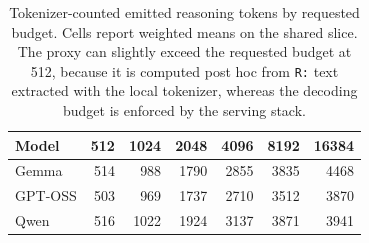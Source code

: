 \begin{table}[t]
    \centering
    \caption{Tokenizer-counted emitted reasoning tokens by requested budget. Cells report weighted means on the shared slice. The proxy can slightly exceed the requested budget at 512, because it is computed post hoc from \texttt{R:} text extracted with the local tokenizer, whereas the decoding budget is enforced by the serving stack.}
    \label{tab:used-budget-by-requested}
    \small
    \begin{tabular}{lrrrrrr}
        \toprule
        Model & 512 & 1024 & 2048 & 4096 & 8192 & 16384 \\
        \midrule
        Gemma & 514 & 988 & 1790 & 2855 & 3835 & 4468 \\
        GPT-OSS & 503 & 969 & 1737 & 2710 & 3512 & 3870 \\
        Qwen & 516 & 1022 & 1924 & 3137 & 3871 & 3941 \\
        \bottomrule
    \end{tabular}
\end{table}
